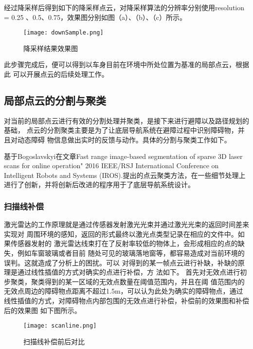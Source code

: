 经过降采样后得到如下的降采样点云，对降采样算法的分辨率分别使用resolution = 0.25
、0.5、0.75，效果图分别如图（a）、（b）、（c）所示。
\begin{figure}[ht]
    \centering
    \texttt{[image: downSample.png]}
    \caption{降采样结果效果图}
\end{figure}


此步骤完成后，便可以得到以车身目前在环境中所处位置为基准的局部点云，根据此
可以开展点云的后续处理工作。



\subsection{局部点云的分割与聚类}
对当前的局部点云进行有效的分割处理并聚类，是接下来进行避障以及路径规划的基础，
点云的分割聚类主要是为了让底层导航系统在避障过程中识别障碍物，并且对动态障碍
物信息做出实时的反馈与动作。具体的分割与聚类工作如下。

基于Bogoslavskyi在文章Fast range image-based segmentation of sparse 3D laser
 scans for online operation" 2016 IEEE/RSJ International Conference on 
 Intelligent Robots and Systems (IROS).提出的点云聚类方法，在一些细节处理上
 进行了创新，并将创新后改进的程序用于了底层导航系统设计。

\subsubsection{扫描线补偿}
激光雷达的工作原理就是通过传感器发射激光光束并通过激光光束的返回时间差来实现对
周围环境的感知，返回的形式最终以激光点类型记录在相应的文件中。如果传感器发射的
激光雷达线束打在了反射率较低的物体上，会形成相应的点的缺失，例如车窗玻璃或者目前
随处可见的玻璃落地窗等，都容易造成对当前环境的误判。这就造成了分析上的困扰。可以
对得到的某一帧点云进行补缺，补缺的原理是通过线性插值的方式对确实的点进行补偿，方
法如下。
首先对无效点进行初步聚类，聚类得到的某一区域的无效点数量在阈值范围内，并且在阈
值范围内的无效点周边的障碍物点距离不超过1.5m，可以认为此处为确实的障碍物点，通过
线性插值的方式，对障碍物点内部包围的无效点进行补偿，补偿前的效果图和补偿后的效果图
如下图所示。
\begin{figure}[ht]
    \centering
    \texttt{[image: scanline.png]}
    \caption{扫描线补偿前后对比}
\end{figure}

